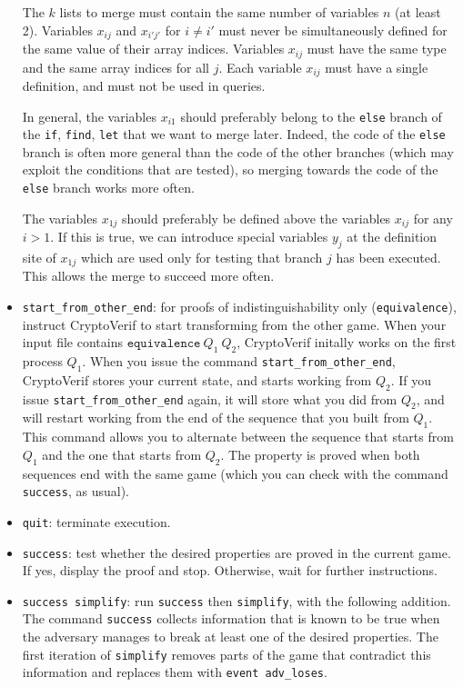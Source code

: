 \documentclass{article}
\begin{document}
\begin{itemize}
  The $k$ lists to merge must contain the same number of variables $n$
  (at least 2). Variables $x_{ij}$ and $x_{i'j'}$ for $i \neq i'$ must
  never be simultaneously defined for the same value of their array
  indices.  Variables $x_{ij}$ must have the same type and the same
  array indices for all $j$. Each variable $x_{ij}$ must have a single
  definition, and must not be used in queries.

  In general, the variables $x_{i1}$ should preferably belong to the
  \texttt{else} branch of the {\tt if}, {\tt find}, {\tt let} that we
  want to merge later. Indeed, the code of the {\tt else} branch is
  often more general than the code of the other branches (which may
  exploit the conditions that are tested), so merging towards the code
  of the {\tt else} branch works more often.

  The variables $x_{1j}$ should preferably be defined above the
  variables $x_{ij}$ for any $i > 1$. If this is true, we can
  introduce special variables $y_j$ at the definition site of $x_{1j}$
  which are used only for testing that branch $j$ has been executed.
  This allows the merge to succeed more often.

\item \texttt{start\_from\_other\_end}: for proofs of indistinguishability
  only (\texttt{equivalence}), instruct CryptoVerif to start transforming
  from the other game. When your input file contains
  $\texttt{equivalence}\ Q_1\ Q_2$, CryptoVerif initally works on the first  
  process $Q_1$. When you issue the command \texttt{start\_from\_other\_end},
  CryptoVerif stores your current state, and starts working from $Q_2$.
  If you issue \texttt{start\_from\_other\_end} again, it will store
  what you did from $Q_2$, and will restart working from the end of the
  sequence that you built from $Q_1$. This command allows you to
  alternate between the sequence that starts from $Q_1$ and the one that
  starts from $Q_2$. The property is proved when both sequences end with the
  same game (which you can check with the command \texttt{success}, as usual).
  
\item \texttt{quit}: terminate execution.

\item \texttt{success}: test whether the desired properties are
proved in the current game. If yes, display the proof and stop.
Otherwise, wait for further instructions.

\item \texttt{success simplify}: run \texttt{success} then \texttt{simplify}, with the following addition. The command \texttt{success} collects information that is known to be true when the adversary manages to break at least one of the desired properties. The first iteration of \texttt{simplify} removes parts of the game that contradict this information and replaces them with \texttt{event adv\_loses}.


\end{itemize}
\end{document}

